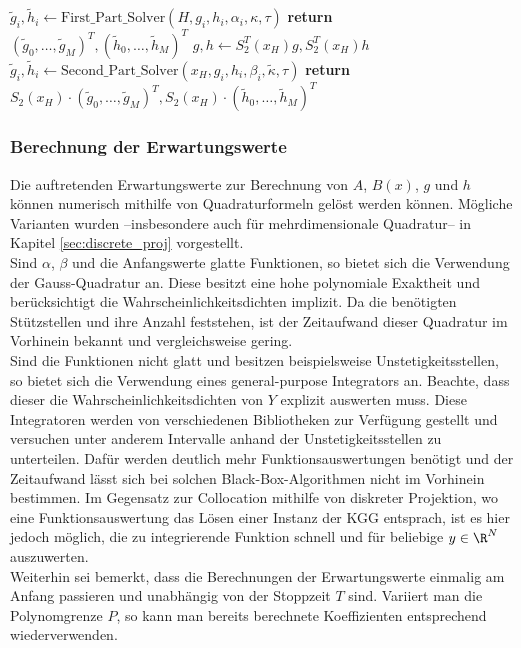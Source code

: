 \begin{algorithm}[ht]
\begin{algorithmic}[1]
        		\State $\tilde{g}_i,\tilde{h}_i\gets \text{First\_Part\_Solver}(H,g_i, h_i,\alpha_i,\kappa,\tau)$
        	\EndFor
        	\State \textbf{return} $(\tilde{g}_0,\dots,\tilde{g}_M)^T, (\tilde{h}_0,\dots,\tilde{h}_M)^T$
        \EndFunction
        	\State $g,h\gets S_2^T(x_H)g, S_2^T(x_H)h$
        		\State $\tilde{g}_i,\tilde{h}_i\gets \text{Second\_Part\_Solver}(x_H,g_i,h_i,\beta_i,\tilde{\kappa},\tau)$
        	\EndFor
        	\State \textbf{return} $S_2(x_H)\cdot (\tilde{g}_0,\dots,\tilde{g}_M)^T, S_2(x_H)\cdot (\tilde{h}_0,\dots,\tilde{h}_M)^T$
        \EndFunction
        
    \end{algorithmic}
\end{algorithm}
\subsubsection*{Berechnung der Erwartungswerte}
Die auftretenden Erwartungswerte zur Berechnung von $A$, $B(x)$, $g$ und $h$ können numerisch mithilfe von Quadraturformeln gelöst werden können. Mögliche Varianten wurden --insbesondere auch für mehrdimensionale Quadratur-- in Kapitel \ref{sec:discrete_proj} vorgestellt.\\
Sind $\alpha$, $\beta$ und die Anfangswerte glatte Funktionen, so bietet sich die Verwendung der Gauss-Quadratur an. Diese besitzt eine hohe polynomiale Exaktheit und berücksichtigt die Wahrscheinlichkeitsdichten implizit. Da die benötigten Stützstellen und ihre Anzahl feststehen, ist der Zeitaufwand dieser Quadratur im Vorhinein bekannt und vergleichsweise gering.\\[0.2cm]
Sind die Funktionen nicht glatt und besitzen beispielsweise Unstetigkeitsstellen, so bietet sich die Verwendung eines general-purpose Integrators an. Beachte, dass dieser die Wahrscheinlichkeitsdichten von $Y$ explizit auswerten muss. Diese Integratoren werden von verschiedenen Bibliotheken zur Verfügung gestellt und versuchen unter anderem Intervalle anhand der Unstetigkeitsstellen zu unterteilen. Dafür werden deutlich mehr Funktionsauswertungen benötigt und der Zeitaufwand lässt sich bei solchen Black-Box-Algorithmen nicht im Vorhinein bestimmen. Im Gegensatz zur Collocation mithilfe von diskreter Projektion, wo eine Funktionsauswertung das Lösen einer Instanz der KGG entsprach, ist es hier jedoch möglich, die zu integrierende Funktion schnell und für beliebige $y\in\R^N$ auszuwerten.\\[0.2cm]
Weiterhin sei bemerkt, dass die Berechnungen der Erwartungswerte einmalig am Anfang passieren und unabhängig von der Stoppzeit $T$ sind. Variiert man die Polynomgrenze $P$, so kann man bereits berechnete Koeffizienten entsprechend wiederverwenden.
